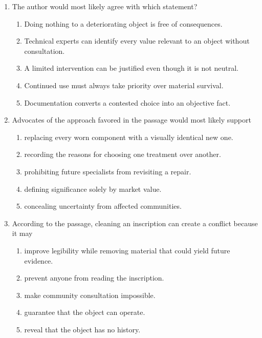 \begin{enumerate}
\item The author would most likely agree with which statement?
  \begin{enumerate}
  \item Doing nothing to a deteriorating object is free of consequences.
  \item Technical experts can identify every value relevant to an object without
        consultation.
  \item A limited intervention can be justified even though it is not neutral.
  \item Continued use must always take priority over material survival.
  \item Documentation converts a contested choice into an objective fact.
  \end{enumerate}

\item Advocates of the approach favored in the passage would most likely support
  \begin{enumerate}
  \item replacing every worn component with a visually identical new one.
  \item recording the reasons for choosing one treatment over another.
  \item prohibiting future specialists from revisiting a repair.
  \item defining significance solely by market value.
  \item concealing uncertainty from affected communities.
  \end{enumerate}

\item According to the passage, cleaning an inscription can create a conflict
because it may
  \begin{enumerate}
  \item improve legibility while removing material that could yield future evidence.
  \item prevent anyone from reading the inscription.
  \item make community consultation impossible.
  \item guarantee that the object can operate.
  \item reveal that the object has no history.
  \end{enumerate}


\end{enumerate}
